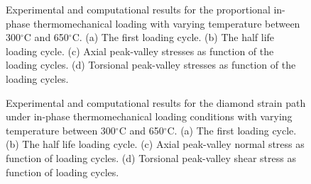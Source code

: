 \begin{figure}[!htp]
\caption{Experimental and computational results for the proportional in-phase thermomechanical loading with varying temperature between 300$^\circ$C and 650$^\circ$C. (a) The first loading cycle. (b) The half life loading cycle. (c) Axial peak-valley stresses as function of the loading cycles. (d) Torsional peak-valley stresses as function of the loading cycles.}
\label{Fig:TMF_Prop45}
\end{figure}

\begin{figure}
\caption{Experimental and computational results for the diamond strain path under in-phase thermomechanical loading conditions with varying temperature between  300$^\circ$C and 650$^\circ$C. (a) The first loading cycle. (b) The half life loading cycle. (c) Axial peak-valley normal stress as function of loading cycles. (d) Torsional peak-valley shear stress as function of  loading cycles.}
\label{Fig:TMF_Diamond}
\end{figure}

